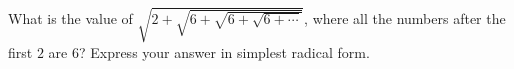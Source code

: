 What is the value of $\sqrt{2+\sqrt{6+\sqrt{6+\sqrt{6+\cdots}}}}$, where all the numbers after the first $2$ are $6$? Express your answer in simplest radical form.
